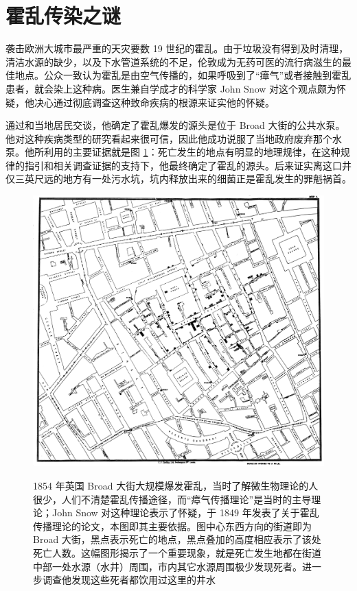 \documentclass[
  b5paper,
  UTF8,twoside]{book}
\begin{document}
\hypertarget{sec:the-mystery-of-cholera-infection}{%
\section{霍乱传染之谜}\label{sec:the-mystery-of-cholera-infection}}

袭击欧洲大城市最严重的天灾要数 19 世纪的霍乱。由于垃圾没有得到及时清理，清洁水源的缺少，以及下水管道系统的不足，伦敦成为无药可医的流行病滋生的最佳地点。公众一致认为霍乱是由空气传播的，如果呼吸到了``瘴气''或者接触到霍乱患者，就会染上这种病。医生兼自学成才的科学家 John Snow 对这个观点颇为怀疑，他决心通过彻底调查这种致命疾病的根源来证实他的怀疑。

通过和当地居民交谈，他确定了霍乱爆发的源头是位于 Broad 大街的公共水泵。他对这种疾病类型的研究看起来很可信，因此他成功说服了当地政府废弃那个水泵。他所利用的主要证据就是图 \ref{fig:snow-cholera}：死亡发生的地点有明显的地理规律，在这种规律的指引和相关调查证据的支持下，他最终确定了霍乱的源头。后来证实离这口井仅三英尺远的地方有一处污水坑，坑内释放出来的细菌正是霍乱发生的罪魁祸首。

\begin{figure}

{\centering \href{https://en.wikipedia.org/wiki/John_Snow_(physician)}{\includegraphics{images/Snow-cholera-map} }

}

\caption[John Snow 的霍乱传染原因探索图]{1854 年英国 Broad 大街大规模爆发霍乱，当时了解微生物理论的人很少，人们不清楚霍乱传播途径，而``瘴气传播理论''是当时的主导理论；John Snow 对这种理论表示了怀疑，于 1849 年发表了关于霍乱传播理论的论文，本图即其主要依据。图中心东西方向的街道即为 Broad 大街，黑点表示死亡的地点，黑点叠加的高度相应表示了该处死亡人数。这幅图形揭示了一个重要现象，就是死亡发生地都在街道中部一处水源（水井）周围，市内其它水源周围极少发现死者。进一步调查他发现这些死者都饮用过这里的井水}\label{fig:snow-cholera}
\end{figure}
\end{document}
